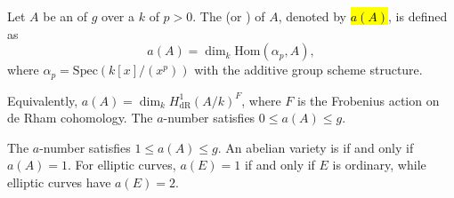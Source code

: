 \begin{definition} \label{definition:a_number_of_abelian_variety_over_characteristic_p_field}
    Let $A$ be an  of  $g$ over a  $k$ of  $p > 0$.
    The  (or ) of $A$, denoted by \hl{$a(A)$}, is defined as
    $$a(A) = \dim_k \mathrm{Hom}(\alpha_p, A),$$
    where $\alpha_p = \mathrm{Spec}(k[x]/(x^p))$ with the additive group scheme structure.

    Equivalently, $a(A) = \dim_k H^1_{\mathrm{dR}}(A/k)^F$, where $F$ is the Frobenius action on de Rham cohomology. The $a$-number satisfies $0 \leq a(A) \leq g$.

    The $a$-number satisfies $1 \leq a(A) \leq g$. An abelian variety is  if and only if $a(A) = 1$. For elliptic curves, $a(E) = 1$ if and only if $E$ is ordinary, while  elliptic curves have $a(E) = 2$.
\end{definition}
